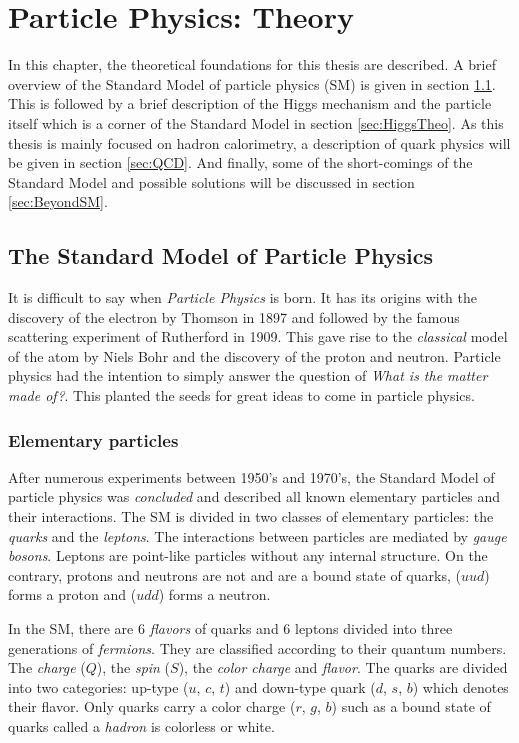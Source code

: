 \chapter{Particle Physics: Theory}

In this chapter, the theoretical foundations for this thesis are described. A brief overview of the Standard Model of particle physics (SM) is given in section \ref{sec:SM}. This is followed by a brief description of the Higgs mechanism and the particle itself which is a corner of the Standard Model in section \ref{sec:HiggsTheo}. As this thesis is mainly focused on hadron calorimetry, a description of quark physics will be given in section \ref{sec:QCD}. And finally, some of the short-comings of the Standard Model and possible solutions will be discussed in section \ref{sec:BeyondSM}.

\section{The Standard Model of Particle Physics}
\label{sec:SM}

It is difficult to say when \textit{Particle Physics} is born. It has its origins with the discovery of the electron by Thomson \cite{JJThomson:1897} in 1897 and followed by the famous scattering experiment of Rutherford \cite{Rutherford:1911} in 1909. This gave rise to the \textit{classical} model of the atom by Niels Bohr and the discovery of the proton and neutron. Particle physics had the intention to simply answer the question of \textit{What is the matter made of?}. This planted the seeds for great ideas to come in particle physics.

\subsection{Elementary particles}

After numerous experiments between 1950's and 1970's, the Standard Model of particle physics was \textit{concluded} and described all known elementary particles and their interactions. The SM is divided in two classes of elementary particles: the \textit{quarks} and the \textit{leptons}. The interactions between particles are mediated by \textit{gauge bosons}. Leptons are point-like particles without any internal structure. On the contrary, protons and neutrons are not and are a bound state of quarks, ($uud$) forms a proton and ($udd$) forms a neutron.

In the SM, there are 6 \textit{flavors} of quarks and 6 leptons divided into three generations of \textit{fermions}. They are classified according to their quantum numbers. The \textit{charge} ($Q$), the \textit{spin} ($S$), the \textit{color charge} and \textit{flavor}. The quarks are divided into two categories: up-type ($u$, $c$, $t$) and down-type quark ($d$, $s$, $b$) which denotes their flavor. Only quarks carry a color charge ($r$, $g$, $b$) such as a bound state of quarks called a \textit{hadron} is colorless or white.

